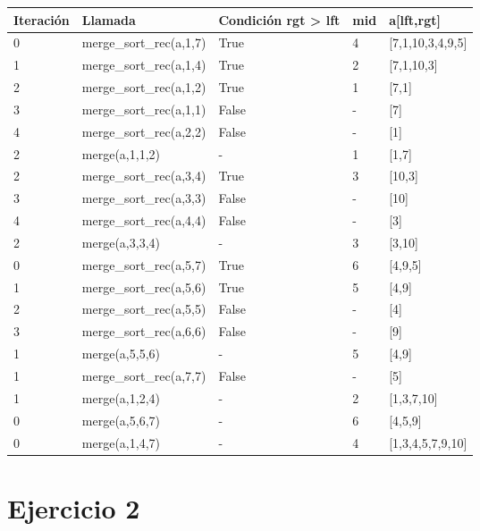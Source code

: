 \documentclass{article}
\begin{document}
\begin{tabularx}{\textwidth}{|p{2cm}|X|X|p{2cm}|X|}
  \hline
  \textbf{Iteración} & \textbf{Llamada} & \textbf{Condición rgt > lft} & \textbf{mid} & \textbf{a[lft,rgt]} \\
  \hline
  0 & merge\_sort\_rec(a,1,7) & True & 4 & [7,1,10,3,4,9,5] \\
  1 & merge\_sort\_rec(a,1,4) & True & 2 & [7,1,10,3] \\
  2 & merge\_sort\_rec(a,1,2) & True & 1 & [7,1] \\
  3 & merge\_sort\_rec(a,1,1) & False & - & [7] \\
  4 & merge\_sort\_rec(a,2,2) & False & - & [1] \\
  \hline
  2 & merge(a,1,1,2) & - & 1 & [1,7] \\
  \hline
  2 & merge\_sort\_rec(a,3,4) & True & 3 & [10,3] \\
  3 & merge\_sort\_rec(a,3,3) & False & - & [10] \\
  4 & merge\_sort\_rec(a,4,4) & False & - & [3] \\
  \hline
  2 & merge(a,3,3,4) & - & 3 & [3,10] \\
  \hline
  0 & merge\_sort\_rec(a,5,7) & True & 6 & [4,9,5] \\
  1 & merge\_sort\_rec(a,5,6) & True & 5 & [4,9] \\
  2 & merge\_sort\_rec(a,5,5) & False & - & [4] \\
  3 & merge\_sort\_rec(a,6,6) & False & - & [9] \\
  \hline
  1 & merge(a,5,5,6) & - & 5 & [4,9] \\
  \hline
  1 & merge\_sort\_rec(a,7,7) & False & - & [5] \\
  \hline
  1 & merge(a,1,2,4) & - & 2 & [1,3,7,10] \\
  \hline
  0 & merge(a,5,6,7) & - & 6 & [4,5,9] \\
  \hline
  0 & merge(a,1,4,7) & - & 4 & [1,3,4,5,7,9,10] \\
  \hline
\end{tabularx}

\section*{Ejercicio 2}
\end{document}
